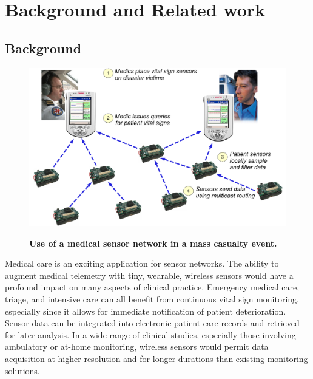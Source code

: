 \chapter{Background and Related work}
\label{chap-related}

\section{Background}
\label{sec-cb-background}

\begin{figure}[t]
\begin{center}
\includegraphics[width=\hsize]{./resources/codeblue-nsdi06/figures/arch/disaster3.pdf} \\
\end{center}
\caption{{\small\bf Use of a medical sensor network in a mass casualty
event.} }
\label{fig-app-example}
\end{figure}


Medical care is an exciting application for sensor networks. The
ability to augment medical telemetry with tiny, wearable, wireless
sensors would have a profound impact on many aspects of clinical
practice. Emergency medical care, triage, and intensive care can all
benefit from continuous vital sign monitoring, especially since it
allows for immediate notification of patient deterioration. Sensor
data can be integrated into electronic patient care records and
retrieved for later analysis. In a wide range of clinical studies,
especially those involving ambulatory or at-home monitoring, wireless
sensors would permit data acquisition at higher resolution and for
longer durations than existing monitoring solutions.

